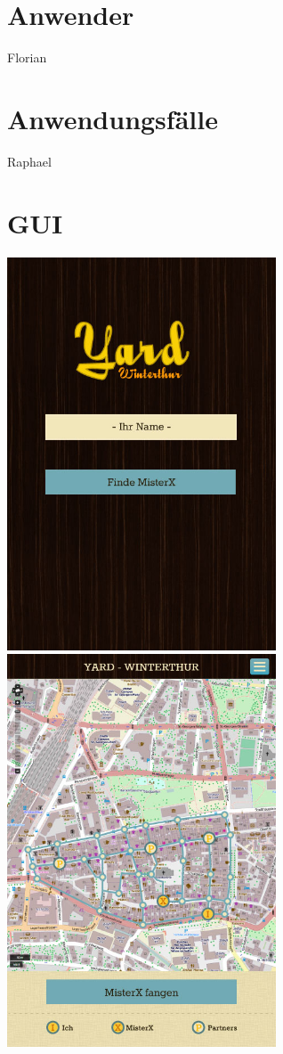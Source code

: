 \documentclass[11pt]{article}
\begin{document}
\section{Anwender}
Florian

\section{Anwendungsfälle}
Raphael

\section{GUI}
\includegraphics[width=8cm]{Bilder/homeView.jpg}
\includegraphics[width=8cm]{Bilder/karteView.jpg}
\end{document}
